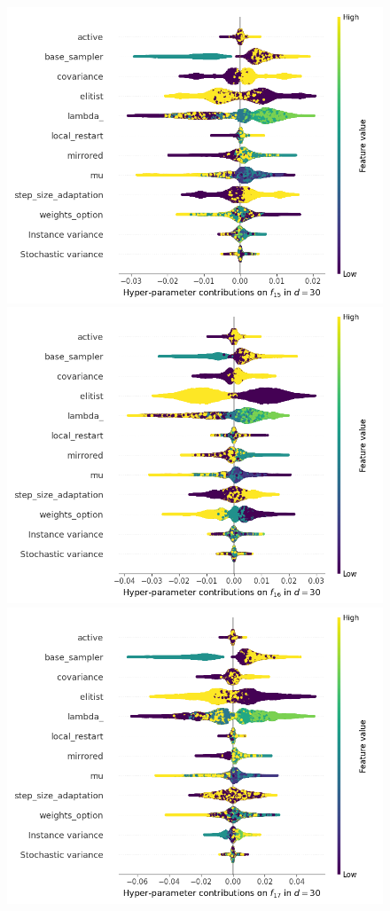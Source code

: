 \begin{figure}[t]
	\includegraphics[height=0.15\textheight,trim=60mm 0mm 30mm 0mm,clip]{cma_img_new/img_summary_f15_d30.png}
	\includegraphics[height=0.15\textheight,trim=60mm 0mm 0mm 0mm,clip]{cma_img_new/img_summary_f16_d30.png}
	\includegraphics[height=0.15\textheight,trim=0mm 0mm 30mm 0mm,clip]{cma_img_new/img_summary_f17_d30.png}

\end{figure}
